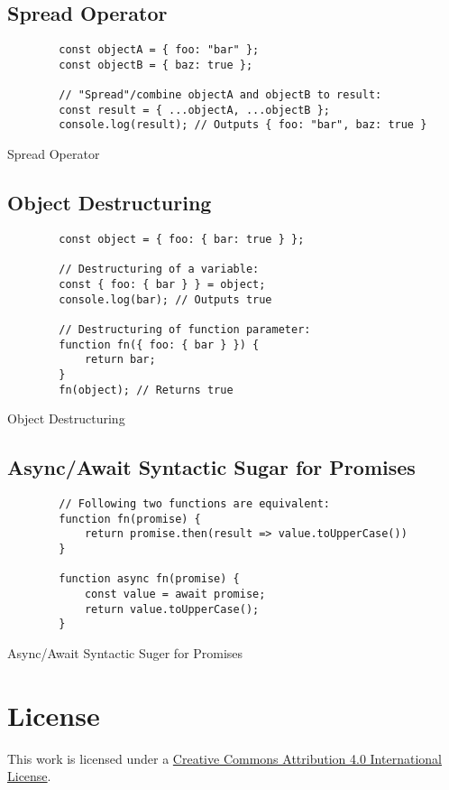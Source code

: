 \documentclass[12pt,a4paper]{article}
\begin{document}
\subsection{Spread Operator}
\begin{listing}[H]
	\begin{verbatim}
		const objectA = { foo: "bar" };
		const objectB = { baz: true };

		// "Spread"/combine objectA and objectB to result:
		const result = { ...objectA, ...objectB };
		console.log(result); // Outputs { foo: "bar", baz: true }
	\end{verbatim}
	\caption{Spread Operator}
\end{listing}

\subsection{Object Destructuring}
\begin{listing}[H]
	\begin{verbatim}
		const object = { foo: { bar: true } };

		// Destructuring of a variable:
		const { foo: { bar } } = object;
		console.log(bar); // Outputs true

		// Destructuring of function parameter:
		function fn({ foo: { bar } }) {
			return bar;
		}
		fn(object); // Returns true
	\end{verbatim}
	\caption{Object Destructuring}
\end{listing}

\subsection{Async/Await Syntactic Sugar for Promises}
\begin{listing}[H]
	\begin{verbatim}
		// Following two functions are equivalent:
		function fn(promise) {
			return promise.then(result => value.toUpperCase())
		}

		function async fn(promise) {
			const value = await promise;
			return value.toUpperCase();
		}
	\end{verbatim}
	\caption{Async/Await Syntactic Suger for Promises}
\end{listing}





\section*{License}
\ccby\thinspace\thinspace This work is licensed under a \href{https://creativecommons.org/licenses/by/4.0/}{Creative Commons Attribution 4.0 International License}.
\end{document}
